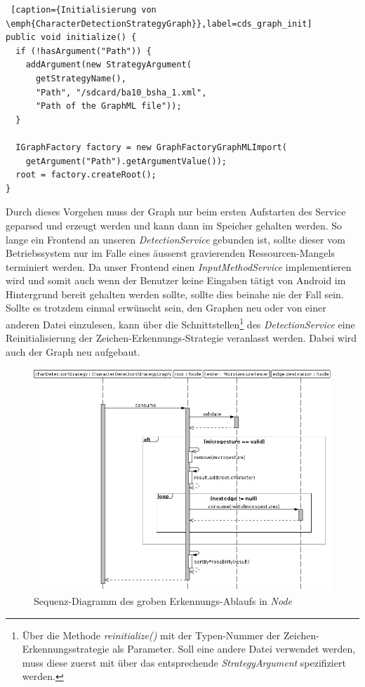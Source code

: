 \begin{lstlisting} [caption={Initialisierung von \emph{CharacterDetectionStrategyGraph}},label=cds_graph_init]
public void initialize() {
  if (!hasArgument("Path")) {
    addArgument(new StrategyArgument(
      getStrategyName(), 
      "Path", "/sdcard/ba10_bsha_1.xml", 
      "Path of the GraphML file"));
  }

  IGraphFactory factory = new GraphFactoryGraphMLImport(
    getArgument("Path").getArgumentValue());
  root = factory.createRoot();	
}
\end{lstlisting}

Durch dieses Vorgehen muss der Graph nur beim ersten Aufstarten des Service geparsed und erzeugt werden und kann dann im Speicher gehalten werden. So lange ein Frontend an unseren \emph{DetectionService} gebunden ist, sollte dieser vom Betriebssystem nur im Falle eines äusserst gravierenden Ressourcen-Mangels terminiert werden. Da unser Frontend einen \emph{InputMethodService} implementieren wird und somit auch wenn der Benutzer keine Eingaben tätigt von Android im Hintergrund bereit gehalten werden sollte, sollte dies beinahe nie der Fall sein. Sollte es trotzdem einmal erwünscht sein, den Graphen neu oder von einer anderen Datei einzulesen, kann über die Schnittstellen\footnote{Über die Methode \emph{reinitialize()} mit der Typen-Nummer der Zeichen-Erkennungsstrategie als Parameter. Soll eine andere Datei verwendet werden, muss diese zuerst mit über das entsprechende \emph{StrategyArgument} spezifiziert werden.} des \emph{DetectionService} eine Reinitialisierung der Zeichen-Erkennungs-Strategie veranlasst werden. Dabei wird auch der Graph neu aufgebaut.

\begin{figure}[h!]
   \centering
   \includegraphics[width=\textwidth]{img/uml_sd_consume} 
   \caption{Sequenz-Diagramm des groben Erkennungs-Ablaufs in \emph{Node}}
   \label{fig:sd_consume}
\end{figure}

